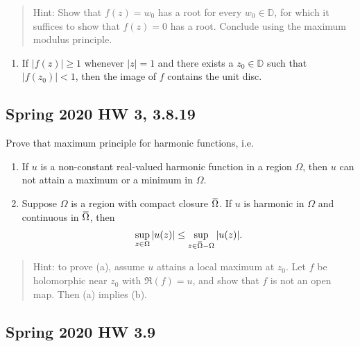 \begin{quote}
Hint: Show that \(f(z) = w_0\) has a root for every
\(w_0 \in {\mathbb{D}}\), for which it suffices to show that
\(f(z) = 0\) has a root. Conclude using the maximum modulus principle.
\end{quote}

\begin{enumerate}
\def\labelenumi{\alph{enumi}.}
\setcounter{enumi}{1}
\tightlist
\item
  If \({\left\lvert {f(z)} \right\rvert} \geq 1\) whenever
  \({\left\lvert {z} \right\rvert} = 1\) and there exists a
  \(z_0\in {\mathbb{D}}\) such that
  \({\left\lvert {f(z_0)} \right\rvert} < 1\), then the image of \(f\)
  contains the unit disc.
\end{enumerate}

\hypertarget{spring-2020-hw-3-3.8.19}{%
\subsection{Spring 2020 HW 3, 3.8.19}\label{spring-2020-hw-3-3.8.19}}

Prove that maximum principle for harmonic functions, i.e.

\begin{enumerate}
\def\labelenumi{\alph{enumi}.}
\item
  If \(u\) is a non-constant real-valued harmonic function in a region
  \(\Omega\), then \(u\) can not attain a maximum or a minimum in
  \(\Omega\).
\item
  Suppose \(\Omega\) is a region with compact closure
  \(\mkern 1.5mu\overline{\mkern-1.5mu\Omega\mkern-1.5mu}\mkern 1.5mu\).
  If \(u\) is harmonic in \(\Omega\) and continuous in
  \(\mkern 1.5mu\overline{\mkern-1.5mu\Omega\mkern-1.5mu}\mkern 1.5mu\),
  then
  \begin{align*}
   \sup _{z \in \Omega}|u(z)| \leq \sup _{z \in \mkern 1.5mu\overline{\mkern-1.5mu\Omega \mkern-1.5mu}\mkern 1.5mu-\Omega}|u(z)|
   .\end{align*}
\end{enumerate}

\begin{quote}
Hint: to prove (a), assume \(u\) attains a local maximum at \(z_0\). Let
\(f\) be holomorphic near \(z_0\) with \(\Re(f) = u\), and show that
\(f\) is not an open map. Then (a) implies (b).
\end{quote}

\hypertarget{spring-2020-hw-3.9}{%
\subsection{Spring 2020 HW 3.9}\label{spring-2020-hw-3.9}}

